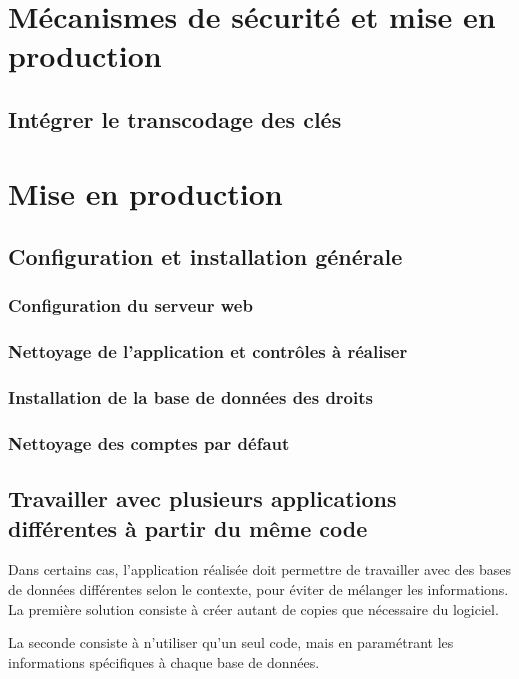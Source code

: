\chapter{Mécanismes de sécurité et mise en production}

\section{Intégrer le transcodage des clés}

\chapter{Mise en production}

\section{Configuration et installation générale}

\subsection{Configuration du serveur web}

\subsection{Nettoyage de l'application et contrôles à réaliser}

\subsection{Installation de la base de données des droits}

\subsection{Nettoyage des comptes par défaut}

\section{Travailler avec plusieurs applications différentes à partir du même code}\label{dnsmultiple}

Dans certains cas, l'application réalisée doit permettre de travailler avec des bases de données différentes selon le contexte, pour éviter de mélanger les informations. La première solution consiste à créer autant de copies que nécessaire du logiciel.

La seconde consiste à n'utiliser qu'un seul code, mais en paramétrant les informations spécifiques à chaque base de données.

